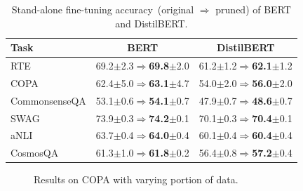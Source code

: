 \begin{table}[th!]
	\centering
	\scriptsize
	\begin{tabular}{l|cc}
		\toprule
		\textbf{Task} & BERT & DistilBERT\\
		\midrule
		RTE & 69.2$\pm${\scriptsize 2.3}$\Rightarrow$\textbf{69.8}$\pm${\scriptsize2.0} &61.2$\pm${\scriptsize 1.2}$\Rightarrow$\textbf{62.1}$\pm${\scriptsize 1.2}\\
		
		COPA & 62.4$\pm${\scriptsize 5.0}$\Rightarrow$\textbf{63.1}$\pm${\scriptsize 4.7}    & 54.0$\pm${\scriptsize 2.0}$\Rightarrow$\textbf{56.0}$\pm${\scriptsize 2.0}   \\
		
		CommonsenseQA & 53.1$\pm${\scriptsize 0.6}$\Rightarrow$\textbf{54.1}$\pm${\scriptsize 0.7}   &47.9$\pm${\scriptsize 0.7}$\Rightarrow$\textbf{48.6}$\pm${\scriptsize 0.7}\\
		
		SWAG & 73.9$\pm${\scriptsize 0.3}$\Rightarrow$\textbf{74.2}$\pm${\scriptsize 0.1} &70.1$\pm${\scriptsize 0.3}$\Rightarrow$\textbf{70.4}$\pm${\scriptsize 0.1}  \\
		aNLI &63.7$\pm${\scriptsize 0.4}$\Rightarrow$\textbf{64.0}$\pm${\scriptsize 0.4}  &60.1$\pm${\scriptsize 0.4}$\Rightarrow$\textbf{60.4}$\pm${\scriptsize 0.4}\\
		CosmosQA &61.3$\pm${\scriptsize 1.0}$\Rightarrow$\textbf{61.8}$\pm${\scriptsize 0.2} &56.4$\pm${\scriptsize 0.8}$\Rightarrow$\textbf{57.2}$\pm${\scriptsize 0.4} \\
		\bottomrule
	\end{tabular}
	\caption{Stand-alone fine-tuning accuracy~(original $\Rightarrow$ pruned) of BERT and DistilBERT.\quad}
	\label{table:finetuning}
\end{table}
\begin{figure}[th!]
	\centering
	\caption{Results on COPA with varying portion of data.} \label{fig:copa}
\end{figure}

